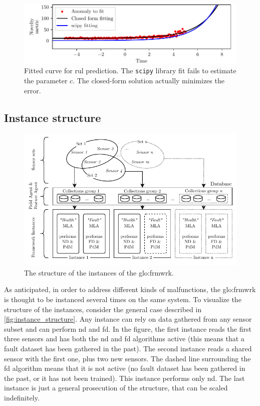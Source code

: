 \begin{figure}
    \centering
    \includegraphics[width=\textwidth]{images/Framework/EXP_3.pdf}
    \caption{Fitted curve for \gls{rul} prediction. The \texttt{scipy} library fit fails to estimate the parameter $c$. The closed-form solution actually minimizes the error.}
    \label{fig:exp_degradation_3}
\end{figure}

\subsection{Instance structure}

\begin{figure}
    \centering
    \includegraphics[scale=1]{images/Framework/FrameworkInstances.pdf}
    \caption{The structure of the instances of the \gls{glo:frmwrk}.}
    \label{fig:instance_structure}
\end{figure}

As anticipated, in order to address different kinds of malfunctions, the \gls{glo:frmwrk} is thought to be instanced several times on the same system. To visualize the structure of the instances, consider the general case described in \autoref{fig:instance_structure}. Any instance can rely on data gathered from any sensor subset and can perform \gls{nd} and \gls{fd}. In the figure, the first instance reads the first three sensors and has both the \gls{nd} and \gls{fd} algorithms active (this means that a fault dataset has been gathered in the past). The second instance reads a shared sensor with the first one, plus two new sensors. The dashed line surrounding the \gls{fd} algorithm means that it is not active (no fault dataset has been gathered in the past, or it has not been trained). This instance performs only \gls{nd}. The last instance is just a general prosecution of the structure, that can be scaled indefinitely.
